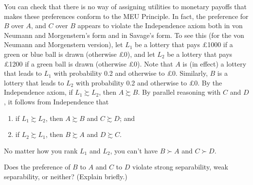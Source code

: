 You can  check that there is no way of assigning utilities to
monetary payoffs that makes these preferences conform to the MEU
Principle. In fact, the preference for $B$ over $A$, and $C$ over $B$
appears to violate the Independence axiom both in von Neumann and
Morgenstern's form and in Savage's form. To see this (for the von
Neumann and Morgenstern version), let $L_1$ be a lottery that pays
£1000 if a green or blue ball is drawn (otherwise £0), and let $L_2$
be a lottery that pays £1200 if a green ball is drawn (otherwise
£0). Note that $A$ is (in effect) a lottery that leads to $L_1$ with
probability 0.2 and otherwise to £0. Similarly, $B$ is a lottery that
leads to $L_2$ with probability 0.2 and otherwise to £0. By the
Independence axiom, if $L_1 \succsim L_2$, then $A \succsim B$. By
parallel reasoning with $C$ and $D$, it follows from Independence that
\begin{enumerate}
  \itemsep0em 
\item if $L_1 \succsim L_2$, then $A \succsim B$ and $C \succsim D$; and
\item if $L_2 \succsim L_1$, then $B \succsim A$ and $D \succsim C$.
\end{enumerate}
No matter how you rank $L_1$ and $L_2$, you can't have $B \succ A$ and $C \succ D$.

\begin{exercise}{2}
  Does the preference of $B$ to $A$ and $C$ to $D$ violate strong
  separability, weak separability, or neither? (Explain briefly.)
\end{exercise}


